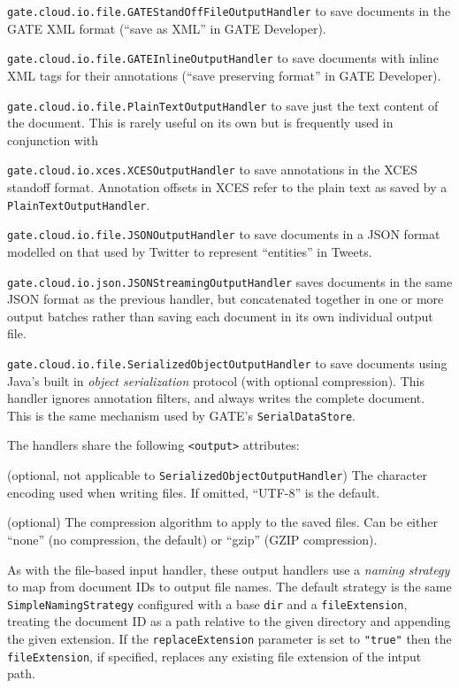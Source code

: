 \bit
\item \verb!gate.cloud.io.file.GATEStandOffFileOutputHandler! to save documents
  in the GATE XML format (``save as XML'' in GATE Developer).
\item \verb!gate.cloud.io.file.GATEInlineOutputHandler! to save documents with
  inline XML tags for their annotations (``save preserving format'' in GATE
  Developer).
\item \verb!gate.cloud.io.file.PlainTextOutputHandler! to save just the text
  content of the document.  This is rarely useful on its own but is frequently
  used in conjunction with
\item \verb!gate.cloud.io.xces.XCESOutputHandler! to save annotations in the
  XCES standoff format.  Annotation offsets in XCES refer to the plain text as
  saved by a \verb!PlainTextOutputHandler!.
\item \verb!gate.cloud.io.file.JSONOutputHandler! to save documents in a JSON
  format modelled on that used by Twitter to represent ``entities'' in Tweets.
\item \verb!gate.cloud.io.json.JSONStreamingOutputHandler! saves documents in
  the same JSON format as the previous handler, but concatenated together in
  one or more output batches rather than saving each document in its own
  individual output file.
\item \verb!gate.cloud.io.file.SerializedObjectOutputHandler! to save documents
  using Java's built in \emph{object serialization} protocol (with optional
  compression).  This handler ignores annotation filters, and always writes
  the complete document.  This is the same mechanism used by GATE's
  \verb!SerialDataStore!.
\eit

The handlers share the following \verb!<output>! attributes:

\bde
\item[encoding] (optional, not applicable to
  \verb!SerializedObjectOutputHandler!) The character encoding used when
  writing files.  If omitted, ``UTF-8'' is the default.
\item[compression] (optional) The compression algorithm to apply to the saved
  files.  Can be either ``none'' (no compression, the default) or ``gzip''
  (GZIP compression).
\ede

As with the file-based input handler, these output handlers use a {\em naming
strategy} to map from document IDs to output file names.  The default strategy
is the same \verb!SimpleNamingStrategy! configured with a base \verb!dir! and a
\verb!fileExtension!, treating the document ID as a path relative to the given
directory and appending the given extension. If the \verb!replaceExtension! parameter
is set to \verb!"true"! then the \verb!fileExtension!, if specified, replaces
any existing file extension of the intput path.

